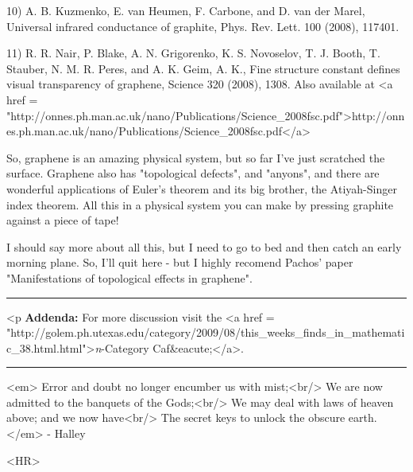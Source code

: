 10) A. B. Kuzmenko, E. van Heumen, F. Carbone, and D. van der Marel,
Universal infrared conductance of graphite, Phys. Rev. Lett. 100
(2008), 117401. 

11) R. R. Nair, P. Blake, A. N. Grigorenko, K. S. Novoselov, T.
J. Booth, T. Stauber, N. M. R. Peres, and A. K. Geim, A. K.,
Fine structure constant defines visual transparency of graphene,
Science 320 (2008), 1308.  Also available at
<a href = "http://onnes.ph.man.ac.uk/nano/Publications/Science_2008fsc.pdf">http://onnes.ph.man.ac.uk/nano/Publications/Science_2008fsc.pdf</a>

So, graphene is an amazing physical system, but so far I've just
scratched the surface.  Graphene also has "topological
defects", and "anyons", and there are wonderful
applications of Euler's theorem and its big brother, the Atiyah-Singer
index theorem.  All this in a physical system you can make by
pressing graphite against a piece of tape!

I should say more about all this, but I need to go to bed and then
catch an early morning plane.  So, I'll quit here - but I highly recomend
Pachos' paper "Manifestations of topological effects in graphene".

\par\noindent\rule{\textwidth}{0.4pt}
<p
\textbf{Addenda:} For more discussion visit the <a href =
"http://golem.ph.utexas.edu/category/2009/08/this_weeks_finds_in_mathematic_38.html.html">\emph{n}-Category
Caf&eacute;</a>.

\par\noindent\rule{\textwidth}{0.4pt}
<em>
Error and doubt no longer encumber us with mist;<br/>
We are now admitted to the banquets of the Gods;<br/>
We may deal with laws of heaven above; and we now have<br/>
The secret keys to unlock the obscure earth.</em> - Halley

<HR>



